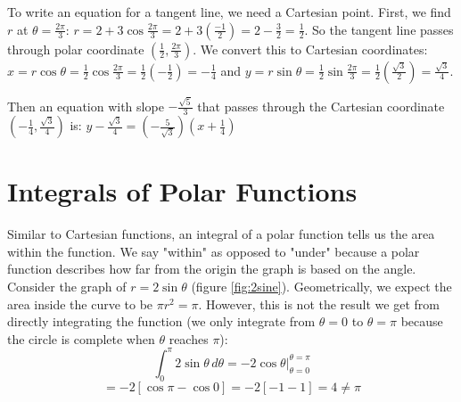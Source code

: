 \begin{Answer}[ref = polar3]
\begin{enumerate}
To write an equation for a tangent line, we need a Cartesian point. First, we 
find $r$ at $\theta = \frac{2\pi}{3}$: $r = 2 + 3\cos{\frac{2\pi}{3}} = 2 + 3 
\left( \frac{-1}{2}\right) = 2 - \frac{3}{2} = \frac{1}{2}$. So the tangent 
line passes through polar coordinate $\left( \frac{1}{2}, \frac{2\pi}{3} 
\right)$. We convert this to Cartesian coordinates: $x = r \cos{\theta} = 
\frac{1}{2} \cos{\frac{2\pi}{3}} = \frac{1}{2} \left(-\frac{1}{2} \right) = -
\frac{1}{4}$ and $y = r \sin{\theta} = \frac{1}{2} \sin{\frac{2\pi}{3}} = 
\frac{1}{2} \left( \frac{\sqrt{3}}{2}\right) = \frac{\sqrt{3}}{4}$. 

Then an equation with slope $-\frac{\sqrt{5}}{3}$ that passes through the 
Cartesian coordinate $\left( -\frac{1}{4}, \frac{\sqrt{3}}{4}\right)$ is: $y - 
\frac{\sqrt{3}}{4} = \left( -\frac{5}{\sqrt{3}} \right) \left(x + \frac{1}{4} 
\right)$
\end{enumerate}
\end{Answer}

\section{Integrals of Polar Functions}
Similar to Cartesian functions, an integral of a polar function tells us the 
area within the function. We say "within" as opposed to "under" because a 
polar function describes how far from the origin the graph is based on the 
angle. Consider the graph of $r = 2\sin{\theta}$ (figure \ref{fig:2sine}). 
Geometrically, we expect the area inside the curve to be $\pi r^2 = \pi$. 
However, this is not the result we get from directly integrating the function 
(we only integrate from $\theta = 0$ to $\theta = \pi$ because the circle is 
complete when $\theta$ reaches $\pi$): 
$$\int_0^{\pi} 2\sin{\theta}\,d\theta = -2\cos{\theta}|_{\theta = 0}^{\theta 
= \pi}$$
$$= -2 \left[ \cos{\pi} - \cos{0} \right] = -2 \left[ -1 - 1 \right] = 4 \neq 
\pi$$

